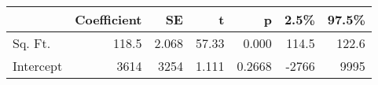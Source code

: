 \begin{tabular}{lrrrrrr}
\toprule
{} &  Coefficient &    SE &     t &      p &  2.5\% &  97.5\% \\
\midrule
Sq. Ft.   &        118.5 & 2.068 & 57.33 &  0.000 & 114.5 &  122.6 \\
Intercept &         3614 &  3254 & 1.111 & 0.2668 & -2766 &   9995 \\
\bottomrule
\end{tabular}
